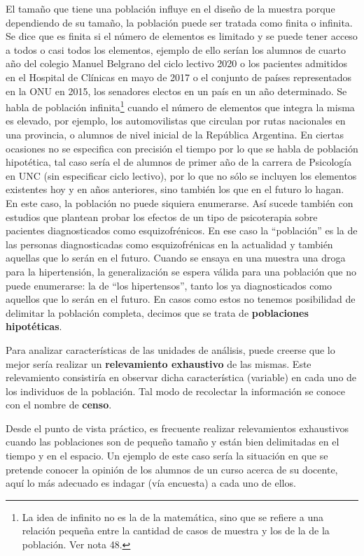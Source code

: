 \documentclass[]{article}
\let\rmarkdownfootnote\footnote%
\def\footnote{\protect\rmarkdownfootnote}
\begin{document}
El tamaño que tiene una población influye en el diseño de la muestra
porque dependiendo de su tamaño, la población puede ser tratada como
finita o infinita. Se dice que es finita si el número de elementos es
limitado y se puede tener acceso a todos o casi todos los elementos,
ejemplo de ello serían los alumnos de cuarto año del colegio Manuel
Belgrano del ciclo lectivo 2020 o los pacientes admitidos en el Hospital
de Clínicas en mayo de 2017 o el conjunto de países representados en la ONU en 2015, los senadores electos en un país en un año determinado. Se habla de población infinita\footnote{La idea de infinito no es la de la matemática, sino que se refiere a una relación pequeña entre la cantidad de casos de muestra y los de la de la población. Ver nota 48.} cuando
el número de elementos que integra la misma es elevado, por ejemplo, los automovilistas que circulan por rutas nacionales en una provincia, o alumnos de nivel inicial de la República Argentina. En ciertas ocasiones no se especifica con precisión el tiempo por lo que se habla de población hipotética, tal caso sería el de alumnos de primer año de la carrera de Psicología en UNC (sin especificar ciclo lectivo), por lo que no sólo se incluyen los elementos existentes hoy y en años anteriores, sino también los que en el futuro lo hagan. En este caso, la población no puede siquiera enumerarse. Así sucede también con estudios que plantean probar los efectos de un tipo de psicoterapia sobre pacientes diagnosticados como esquizofrénicos. En ese caso la ``población'' es la de las personas diagnosticadas como esquizofrénicas en la actualidad y también aquellas que lo serán en el futuro. Cuando se ensaya en una muestra una droga para la hipertensión, la generalización se espera válida para una población que no puede enumerarse: la de ``los hipertensos'', tanto los ya diagnosticados como aquellos que lo serán en el futuro. En casos como estos no tenemos posibilidad de delimitar la población completa, decimos que se trata de \textbf{poblaciones hipotéticas}.

Para analizar características de las unidades de análisis, puede creerse que lo mejor sería realizar un \textbf{relevamiento exhaustivo} de las mismas. Este relevamiento consistiría en observar dicha característica (variable) en cada uno de los individuos de la población. Tal modo de recolectar la información se conoce con el nombre de \textbf{censo}.

Desde el punto de vista práctico, es frecuente realizar relevamientos exhaustivos cuando las poblaciones son de pequeño tamaño y están bien delimitadas en el tiempo y en el espacio. Un ejemplo de este caso sería la situación en que se pretende conocer la opinión de los alumnos de un curso acerca de su docente, aquí lo más adecuado es indagar (vía encuesta) a cada uno de ellos.
\end{document}
